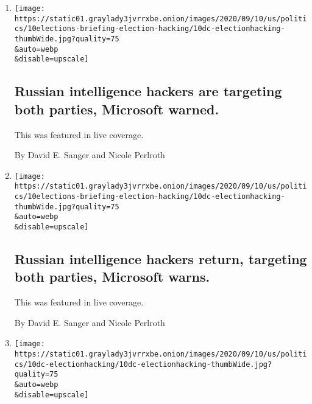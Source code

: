 \begin{enumerate}
\def\labelenumi{\arabic{enumi}.}
\item
  \href{/live/2020/09/11/us/trump-vs-biden/russian-intelligence-hackers-are-targeting-both-parties-microsoft-warned}{}

  \texttt{[image: https://static01.graylady3jvrrxbe.onion/images/2020/09/10/us/politics/10elections-briefing-election-hacking/10dc-electionhacking-thumbWide.jpg?quality=75\\\&auto=webp\\\&disable=upscale]}

  \hypertarget{russian-intelligence-hackers-are-targeting-both-parties-microsoft-warned}{%
  \subsection{Russian intelligence hackers are targeting both parties,
  Microsoft
  warned.}\label{russian-intelligence-hackers-are-targeting-both-parties-microsoft-warned}}

  This was featured in live coverage.

  By David E. Sanger and Nicole Perlroth
\item
  \href{/live/2020/09/10/us/trump-vs-biden/russian-intelligence-hackers-return-targeting-both-parties-microsoft-warns}{}

  \texttt{[image: https://static01.graylady3jvrrxbe.onion/images/2020/09/10/us/politics/10elections-briefing-election-hacking/10dc-electionhacking-thumbWide.jpg?quality=75\\\&auto=webp\\\&disable=upscale]}

  \hypertarget{russian-intelligence-hackers-return-targeting-both-parties-microsoft-warns}{%
  \subsection{Russian intelligence hackers return, targeting both
  parties, Microsoft
  warns.}\label{russian-intelligence-hackers-return-targeting-both-parties-microsoft-warns}}

  This was featured in live coverage.

  By David E. Sanger and Nicole Perlroth
\item
  \href{/2020/09/10/us/politics/russian-hacking-microsoft-biden-trump.html}{}

  \texttt{[image: https://static01.graylady3jvrrxbe.onion/images/2020/09/10/us/politics/10dc-electionhacking/10dc-electionhacking-thumbWide.jpg?quality=75\\\&auto=webp\\\&disable=upscale]}

  \hypertarget{russian-intelligence-hackers-are-back-microsoft-warns-aiming-at-officials-of-both-parties}{%
}
\end{enumerate}
